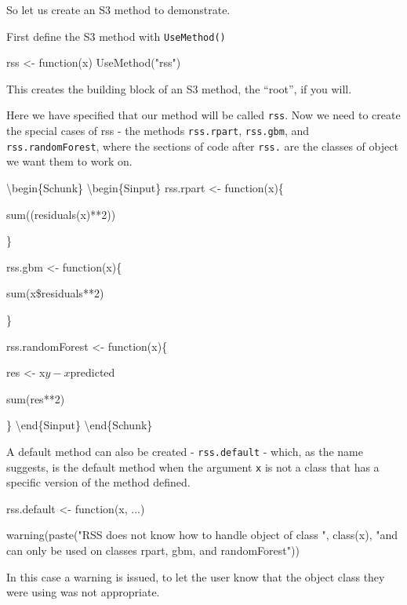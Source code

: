 So let us create an S3 method to demonstrate.

First define the S3 method with \texttt{UseMethod()}

\begin{Schunk}
\begin{Sinput}
rss <- function(x) UseMethod("rss")
\end{Sinput}
\end{Schunk}

This creates the building block of an S3 method, the ``root'', if you
will.

Here we have specified that our method will be called \texttt{rss}. Now
we need to create the special cases of rss - the methods
\texttt{rss.rpart}, \texttt{rss.gbm}, and \texttt{rss.randomForest},
where the sections of code after \texttt{rss.} are the classes of object
we want them to work on.

\textbackslash{}begin\{Schunk\} \textbackslash{}begin\{Sinput\}
rss.rpart \textless{}- function(x)\{

sum((residuals(x)**2))

\}

rss.gbm \textless{}- function(x)\{

sum(x\$residuals**2)

\}

rss.randomForest \textless{}- function(x)\{

res \textless{}- x\(y - x\)predicted

sum(res**2)

\} \textbackslash{}end\{Sinput\} \textbackslash{}end\{Schunk\}

A default method can also be created - \texttt{rss.default} - which, as
the name suggests, is the default method when the argument \texttt{x} is
not a class that has a specific version of the method defined.

\begin{Schunk}
\begin{Sinput}
rss.default <- function(x, ...){
  
  warning(paste("RSS does not know how to handle object of class ", 
                class(x), 
                "and can only be used on classes rpart, gbm, and randomForest"))
          
          }
\end{Sinput}
\end{Schunk}

In this case a warning is issued, to let the user know that the object
class they were using was not appropriate.

